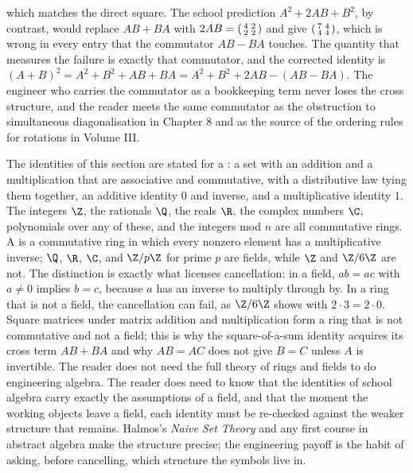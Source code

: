 which matches the direct square. The school prediction $A^{2} + 2AB +
B^{2}$, by contrast, would replace $AB + BA$ with $2AB =
\begin{psmallmatrix} 4 & 2 \\ 2 & 2 \end{psmallmatrix}$ and give
$\begin{psmallmatrix} 7 & 4 \\ 4 & 4 \end{psmallmatrix}$, which is wrong
in every entry that the commutator $AB - BA$ touches. The quantity that
measures the failure is exactly that commutator, and the corrected
identity is $(A+B)^{2} = A^{2} + B^{2} + AB + BA = A^{2} + B^{2} + 2AB -
(AB - BA)$. The engineer who carries the commutator as a bookkeeping
term never loses the cross structure, and the reader meets the same
commutator as the obstruction to simultaneous diagonalisation in Chapter
8 and as the source of the ordering rules for rotations in Volume III.

\begin{mastery}
The identities of this section are stated for a : a set with an addition and a multiplication that are
associative and commutative, with a distributive law tying them
together, an additive identity $0$ and inverse, and a multiplicative
identity $1$. The integers $\Z$, the rationals $\Q$, the reals $\R$,
the complex numbers $\C$, polynomials over any of these, and the
integers mod $n$ are all commutative rings. A  is a
commutative ring in which every nonzero element has a multiplicative
inverse; $\Q$, $\R$, $\C$, and $\Z/p\Z$ for prime $p$ are fields,
while $\Z$ and $\Z/6\Z$ are not. The distinction is exactly what
licenses cancellation: in a field, $ab = ac$ with $a \neq 0$ implies
$b = c$, because $a$ has an inverse to multiply through by. In a ring
that is not a field, the cancellation can fail, as $\Z/6\Z$ shows with
$2 \cdot 3 = 2 \cdot 0$. Square matrices under matrix addition and
multiplication form a ring that is not commutative and not a field;
this is why the square-of-a-sum identity acquires its cross term
$AB + BA$ and why $AB = AC$ does not give $B = C$ unless $A$ is
invertible. The reader does not need the full theory of rings and
fields to do engineering algebra. The reader does need to know that
the identities of school algebra carry exactly the assumptions of a
field, and that the moment the working objects leave a field, each
identity must be re-checked against the weaker structure that
remains. Halmos's \emph{Naive Set Theory} \cite{text:halmos-naive-sets}
and any first course in abstract algebra make the structure precise;
the engineering payoff is the habit of asking, before cancelling,
which structure the symbols live in.
\end{mastery}

